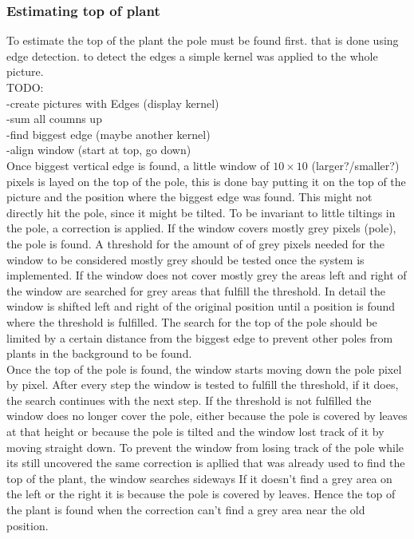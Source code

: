 \subsubsection{Estimating top of plant}
To estimate the top of the plant the pole must be found first. that is done using edge detection.
to detect the edges a simple kernel was applied to the whole picture.\\
TODO:\\
-create pictures with Edges (display kernel)\\
-sum all coumns up\\
-find biggest edge (maybe another kernel)\\
-align window (start at top, go down)\\
Once biggest vertical edge is found, a little window of $10\times10$ (larger?/smaller?) pixels is layed on the top of the pole, this is done bay putting it on the top of the picture and the position where the biggest edge was found. This might not directly hit the pole, since it might be tilted. To be invariant to little tiltings in the pole, a correction is applied. If the window covers mostly grey pixels (pole), the pole is found. A threshold for the amount of of grey pixels needed for the window to be considered mostly grey should be tested once the system is implemented. If the window does not cover mostly grey the areas left and right of the window are searched for grey areas that fulfill the threshold. In detail the window is shifted left and right of the original position until a position is found where the threshold is fulfilled. The search for the top of the pole should be limited by a certain distance from the biggest edge to prevent other poles from plants in the background to be found.\\
Once the top of the pole is found, the window starts moving down the pole pixel by pixel. After every step the window is tested to fulfill the threshold, if it does, the search continues with the next step. If the threshold is not fulfilled the window does no longer cover the pole, either because the pole is covered by leaves at that height or because the pole is tilted and the window lost track of it by moving straight down. To prevent the window from losing track of the pole while its still uncovered the same correction is apllied that was already used to find the top of the plant, the window searches sideways If it doesn't find a grey area on the left or the right it is because the pole is covered by leaves. Hence the top of the plant is found when the correction can't find a grey area near the old position.\\ 
